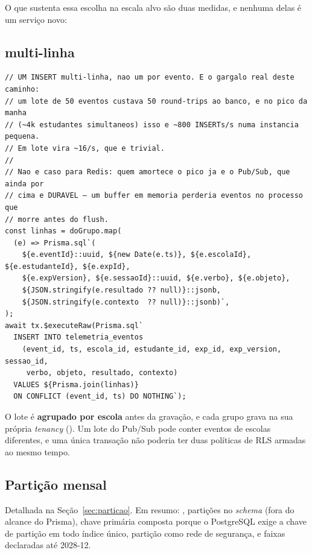 O que sustenta essa escolha na escala alvo são duas medidas, e nenhuma delas é um
serviço novo:

\subsection{ multi-linha}

\begin{lstlisting}[language=tsunoo, caption={O gargalo real, e a correção (\arq{src/telemetry/telemetry.controller.ts})}, label={lst:insert}]
// UM INSERT multi-linha, nao um por evento. E o gargalo real deste caminho:
// um lote de 50 eventos custava 50 round-trips ao banco, e no pico da manha
// (~4k estudantes simultaneos) isso e ~800 INSERTs/s numa instancia pequena.
// Em lote vira ~16/s, que e trivial.
//
// Nao e caso para Redis: quem amortece o pico ja e o Pub/Sub, que ainda por
// cima e DURAVEL — um buffer em memoria perderia eventos no processo que
// morre antes do flush.
const linhas = doGrupo.map(
  (e) => Prisma.sql`(
    ${e.eventId}::uuid, ${new Date(e.ts)}, ${e.escolaId}, ${e.estudanteId}, ${e.expId},
    ${e.expVersion}, ${e.sessaoId}::uuid, ${e.verbo}, ${e.objeto},
    ${JSON.stringify(e.resultado ?? null)}::jsonb,
    ${JSON.stringify(e.contexto  ?? null)}::jsonb)`,
);
await tx.$executeRaw(Prisma.sql`
  INSERT INTO telemetria_eventos
    (event_id, ts, escola_id, estudante_id, exp_id, exp_version, sessao_id,
     verbo, objeto, resultado, contexto)
  VALUES ${Prisma.join(linhas)}
  ON CONFLICT (event_id, ts) DO NOTHING`);
\end{lstlisting}

\begin{nota}
O lote é \textbf{agrupado por escola} antes da gravação, e cada grupo grava na
sua própria \emph{tenancy} (). Um lote do Pub/Sub
pode conter eventos de escolas diferentes, e uma única transação não poderia ter
duas políticas de RLS armadas ao mesmo tempo.
\end{nota}

\subsection{Partição mensal}

Detalhada na Seção~\ref{sec:particao}. Em resumo: ,
partições no \emph{schema}  (fora do alcance do Prisma), chave
primária composta  porque o PostgreSQL exige a chave de
partição em todo índice único, partição  como rede de segurança, e
faixas declaradas até 2028-12.

